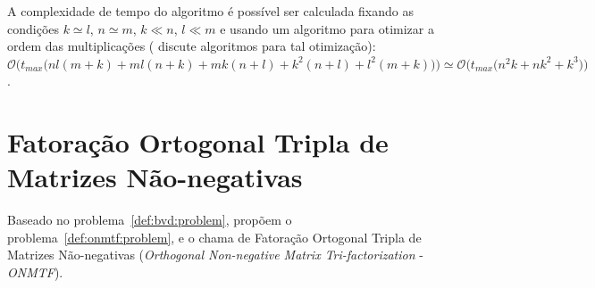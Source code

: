 \documentclass[
    12pt,                %
    oneside,            %
    a4paper,            %
    english,            %
    brazil                %
    ]{abntex2ppgsi}
\newtheorem{theorem}{Teorema}
\begin{document}
A complexidade de tempo do algoritmo é possível ser calculada fixando as condições $k \simeq l$, $n \simeq m$, $k \ll n$, $l \ll m$ e usando um algoritmo para otimizar a ordem das multiplicações ( discute algoritmos para tal otimização): $\mathcal{O}\Big( t_{max} \big( nl (m + k) + ml (n + k) + mk (n + l) + k^2 (n + l) + l^2 (m + k) \big) \Big) \simeq \mathcal{O}\Big( t_{max} \big( n^2k + nk^2 + k^3 ) \Big)$.






\section{Fatoração Ortogonal Tripla de Matrizes Não-negativas}
\label{sec:ONMTF}

Baseado no problema~\ref{def:bvd:problem},  propõem o problema~\ref{def:onmtf:problem}, e o chama de Fatoração Ortogonal Tripla de Matrizes Não-negativas (\textit{Orthogonal Non-negative Matrix Tri-factorization} - \textit{ONMTF}).
\end{document}
